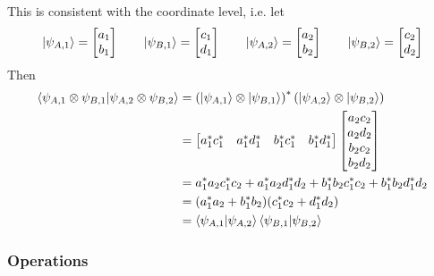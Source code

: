 This is consistent with the coordinate level, i.e. let
\[
\ket{\psi_{A,1}} = \begin{bmatrix} a_1\\b_1\end{bmatrix}
\qquad
\ket{\psi_{B,1}} = \begin{bmatrix} c_1\\d_1\end{bmatrix}
\qquad
\ket{\psi_{A,2}} = \begin{bmatrix} a_2\\b_2\end{bmatrix}
\qquad
\ket{\psi_{B,2}} = \begin{bmatrix} c_2\\d_2\end{bmatrix}
\]
Then
\[
\begin{aligned}
\braket{\psi_{A,1} \otimes \psi_{B,1} | \psi_{A,2} \otimes \psi_{B,2}}
&=
\left(\ket{\psi_{A,1}} \otimes \ket{\psi_{B,1}}\right)^* \left(\ket{\psi_{A,2}} \otimes \ket{\psi_{B,2}}\right)
\\
&=
\begin{bmatrix}
a_1^* c_1^* & a_1^* d_1^* & b_1^* c_1^* & b_1^* d_1^*
\end{bmatrix}
\begin{bmatrix}
a_2 c_2\\
a_2 d_2\\
b_2 c_2\\
b_2 d_2
\end{bmatrix}
\\
&=
a_1^* a_2 c_1^* c_2 + a_1^* a_2 d_1^* d_2 + b_1^* b_2 c_1^* c_2 + b_1^* b_2 d_1^* d_2
\\
&=
(a_1^* a_2 + b_1^* b_2)(c_1^* c_2 + d_1^* d_2)
\\
&=
\braket{\psi_{A,1} | \psi_{A,2}}
\braket{\psi_{B,1} | \psi_{B,2}}
\end{aligned}
\]
\pagebreak[3]

\subsubsection*{Operations}


